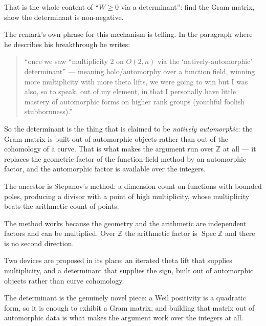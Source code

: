 That is the whole content of ``$W \ge 0$ via a determinant'': find the Gram
matrix, show the determinant is non-negative.

The remark's own phrase for this mechanism is telling. In the paragraph where he
describes his breakthrough he writes:

\begin{quote}
\small
``once we saw ``multiplicity 2 on $O(2,n)$ via the `natively-automorphic'
determinant'' --- meaning holo/automorphy over a function field, winning more
multiplicity with more theta lifts, we were going to win but I was also, so to
speak, out of my element, in that I personally have little mastery of automorphic
forms on higher rank groups (youthful foolish stubbornness).''
\end{quote}

So the determinant is the thing that is claimed to be \emph{natively
automorphic}: the Gram matrix is built out of automorphic objects rather than
out of the cohomology of a curve. That is what makes the argument run over
$\mathbb{Z}$ at all --- it replaces the geometric factor of the function-field
method by an automorphic factor, and the automorphic factor is available over
the integers.

\begin{keytakeaways}
\item The ancestor is Stepanov's method: a dimension count on functions with
bounded poles, producing a divisor with a point of high multiplicity, whose
multiplicity beats the arithmetic count of points.
\item The method works because the geometry and the arithmetic are
independent factors and can be multiplied. Over $\mathbb{Z}$ the arithmetic
factor is $\operatorname{Spec}\mathbb{Z}$ and there is no second direction.
\item Two devices are proposed in its place: an iterated theta lift that
supplies multiplicity, and a determinant that supplies the sign, built out of
automorphic objects rather than curve cohomology.
\item The determinant is the genuinely novel piece: a Weil positivity is a
quadratic form, so it is enough to exhibit a Gram matrix, and building that
matrix out of automorphic data is what makes the argument work over the
integers at all.
\end{keytakeaways}
